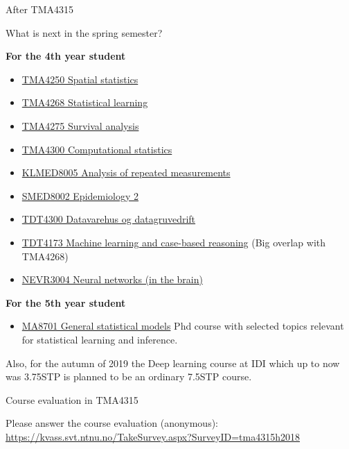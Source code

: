 \documentclass[ignorenonframetext,]{beamer}
\providecommand{\tightlist}{%
  \setlength{\itemsep}{0pt}\setlength{\parskip}{0pt}}
\begin{document}
\begin{frame}{After TMA4315}

What is next in the spring semester?

\textbf{For the 4th year student}

\begin{itemize}
\tightlist
\item
  \href{https://www.math.ntnu.no/emner/TMA4250}{TMA4250 Spatial
  statistics}
\item
  \href{https://www.math.ntnu.no/emner/TMA4268}{TMA4268 Statistical
  learning}
\item
  \href{https://www.math.ntnu.no/emner/TMA4275/}{TMA4275 Survival
  analysis}
\item
  \href{https://www.math.ntnu.no/emner/TMA4300/}{TMA4300 Computational
  statistics}
\item
  \href{https://www.ntnu.no/studier/emner/KLMED8008/}{KLMED8005 Analysis
  of repeated measurements}
\item
  \href{https://www.ntnu.no/studier/emner/SMED8002/}{SMED8002
  Epidemiology 2}
\item
  \href{https://www.ntnu.no/studier/emner/TDT4300/}{TDT4300 Datavarehus
  og datagruvedrift}
\item
  \href{https://www.ntnu.no/studier/emner/TDT4173/}{TDT4173 Machine
  learning and case-based reasoning} (Big overlap with TMA4268)
\item
  \href{https://www.ntnu.no/studier/emner/NEVR3004/}{NEVR3004 Neural
  networks (in the brain)}
\end{itemize}

\end{frame}

\begin{frame}

\textbf{For the 5th year student}

\begin{itemize}
\tightlist
\item
  \href{https://wiki.math.ntnu.no/ma8701/2019v}{MA8701 General
  statistical models} Phd course with selected topics relevant for
  statistical learning and inference.
\end{itemize}

Also, for the autumn of 2019 the Deep learning course at IDI which up to
now was 3.75STP is planned to be an ordinary 7.5STP course.

\end{frame}

\begin{frame}{Course evaluation in TMA4315}

Please answer the course evaluation (anonymous):
\url{https://kvass.svt.ntnu.no/TakeSurvey.aspx?SurveyID=tma4315h2018}

\end{frame}
\end{document}
